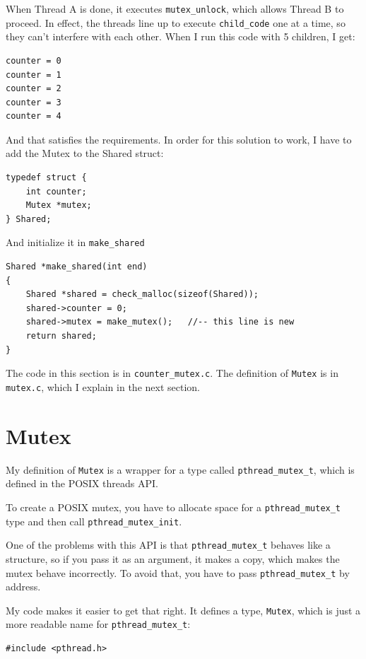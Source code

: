 \documentclass[12pt]{book}
\begin{document}
{When Thread A is done, it executes \verb"mutex_unlock",
which allows Thread B to proceed.  In effect, the threads
line up to execute \verb"child_code" one at a time, so they
can't interfere with each other.  When I run this code with
5 children, I get:

\begin{verbatim}
counter = 0
counter = 1
counter = 2
counter = 3
counter = 4
\end{verbatim}

And that satisfies the requirements.  In order for this solution to
work, I have to add the Mutex to the Shared struct:

\begin{verbatim}
typedef struct {
    int counter;
    Mutex *mutex;
} Shared;
\end{verbatim}

And initialize it in \verb"make_shared"

\begin{verbatim}
Shared *make_shared(int end)
{
    Shared *shared = check_malloc(sizeof(Shared));
    shared->counter = 0;
    shared->mutex = make_mutex();   //-- this line is new
    return shared;
}
\end{verbatim}

The code in this section is in \verb"counter_mutex.c".
The definition of {\tt Mutex} is in {\tt mutex.c}, which I
explain in the next section.



\section{Mutex}

My definition of {\tt Mutex} is a wrapper for a type called
\verb"pthread_mutex_t", which is defined in the POSIX threads API.

To create a POSIX mutex, you have to allocate space for a
\verb"pthread_mutex_t" type and then call \verb"pthread_mutex_init".

One of the problems with this API is that \verb"pthread_mutex_t"
behaves like a structure, so if you pass it as an argument, it makes a
copy, which makes the mutex behave incorrectly.  To avoid that, you have to
pass \verb"pthread_mutex_t" by address.

My code makes it easier to get that right.  It defines a
type, {\tt Mutex}, which is just a more readable name for
\verb"pthread_mutex_t":

\begin{verbatim}
#include <pthread.h>


\end{verbatim}}
\end{document}
